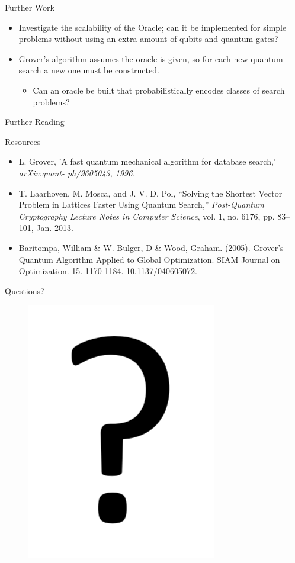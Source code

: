 \documentclass{beamer}
\begin{document}
\begin{frame}{Further Work}
	\begin{itemize}
		\item Investigate the scalability of the Oracle; can it be implemented for simple problems without using an extra amount of qubits and quantum gates?
		\item Grover's algorithm assumes the oracle is given, so for each new quantum search a new one must be constructed.
		      \begin{itemize}
			      \item Can an oracle be built that probabilistically encodes classes of search problems?
		      \end{itemize}
	\end{itemize}
\end{frame}


\begin{frame}{Further Reading}
	\begin{block}{Resources}
		\begin{itemize}
			\item L. Grover, 'A fast quantum mechanical algorithm for database search,' \textit{arXiv:quant- ph/9605043, 1996.}
			\item T. Laarhoven, M. Mosca, and J. V. D. Pol, “Solving the Shortest Vector Problem in Lattices Faster Using Quantum Search,” \textit{Post-Quantum Cryptography Lecture Notes in Computer Science}, vol. 1, no. 6176, pp. 83–101, Jan. 2013.
			\item Baritompa, William \& W. Bulger, D \& Wood, Graham. (2005). Grover's Quantum Algorithm Applied to Global Optimization. SIAM Journal on Optimization. 15. 1170-1184. 10.1137/040605072.
		\end{itemize}
	\end{block}
\end{frame}


\begin{frame}{Questions?}
	\begin{figure}[]
		\centering
		\includegraphics[scale=1]{./question.png}
	\end{figure}
\end{frame}
\end{document}
